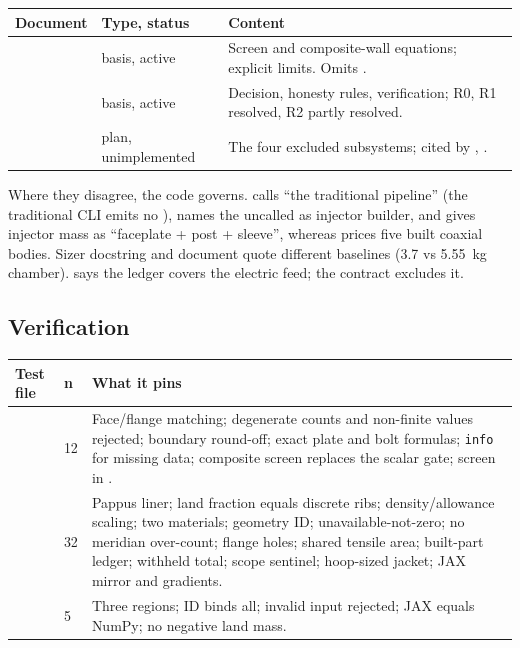 \begingroup\footnotesize
\begin{longtable}{@{}P{7.4cm}P{2.0cm}P{6.8cm}@{}}
\toprule
\textbf{Document} & \textbf{Type, status} & \textbf{Content} \\
\midrule
\endhead
{} & basis, active & Screen and composite-wall equations; explicit limits. Omits . \\
 & basis, active & Decision, honesty rules, verification; R0, R1 resolved, R2 partly resolved. \\
 & plan, unimplemented & The four excluded subsystems; cited by , . \\
\bottomrule
\end{longtable}
\endgroup

Where they disagree, the code governs.  calls  ``the traditional pipeline'' (the traditional CLI emits no ), names the uncalled  as injector builder, and gives injector mass as ``faceplate + post + sleeve'', whereas  prices five built coaxial bodies. Sizer docstring and document quote different baselines (3.7 vs 5.55~kg chamber).  says the ledger covers the electric feed; the contract excludes it.

\subsection{Verification}

\begingroup\footnotesize
\begin{longtable}{@{}P{4.1cm}P{0.6cm}P{11.5cm}@{}}
\toprule
\textbf{Test file} & \textbf{n} & \textbf{What it pins} \\
\midrule
\endhead
{} & 12 & Face/flange matching; degenerate counts and non-finite values rejected; boundary round-off; exact plate and bolt formulas; \texttt{info} for missing data; composite screen replaces the scalar gate; screen in . \\
 & 32 & Pappus liner; land fraction equals discrete ribs; density/allowance scaling; two materials; geometry ID; unavailable-not-zero; no meridian over-count; flange holes; shared tensile area; built-part ledger; withheld total; scope sentinel; hoop-sized jacket; JAX mirror and gradients. \\
 & 5 & Three regions; ID binds all; invalid input rejected; JAX equals NumPy; no negative land mass. \\
\bottomrule
\end{longtable}
\endgroup

